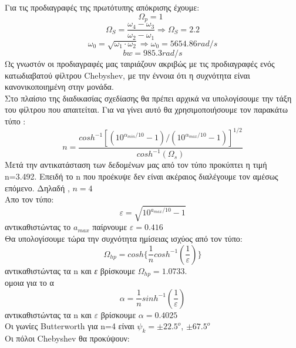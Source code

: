 \documentclass{article}
\begin{document}
{\begin{itemize}
\end{itemize}
Για τις προδιαγραφές της πρωτότυπης απόκρισης έχουμε:
\begin{equation*}
\boxed{Ω_p = 1} \enspace 
\end{equation*}
\begin{equation*}
Ω_S = \frac{ω_4 - ω_3}{ω_2 - ω_1} \Rightarrow \boxed{Ω_S = 2.2}
\end{equation*}
\begin{equation*}
ω_0 = \sqrt{ω_1 \cdot ω_2} \Rightarrow \boxed{ω_0 = 5654.86 rad/s}
\end{equation*}
\begin{equation*}
\boxed{bw = 985.3 rad/s}
\end{equation*}
Ως γνωστόν οι προδιαγραφές μας ταιριάζουν ακριβώς με τις προδιαγραφές ενός κατωδιαβατού φίλτρου Chebyshev, με την έννοια ότι η συχνότητα είναι κανονικοποιημένη στην μονάδα. \\
Στο πλαίσιο της διαδικασίας σχεδίασης θα πρέπει αρχικά να υπολογίσουμε την τάξη του φίλτρου που απαιτείται. Για να γίνει αυτό θα χρησιμοποιήσουμε τον παρακάτω τύπο :
\begin{equation*}
\boxed{n=\frac{cosh^{-1}[(10^{{α_{min}}/{10}}-1)/ (10^{{α_{max}}/{10}}-1)]^{1/2}}{cosh^{-1}(Ω_s)}
}
\end{equation*}
Μετά την αντικατάσταση των δεδομένων μας από τον τύπο προκύπτει η τιμή n=3.492.
Επειδή το n που προέκυψε δεν είναι ακέραιος διαλέγουμε τον αμέσως επόμενο. Δηλαδή , 
$\boxed{n = 4}$ \\
Απο τον τύπο:
\begin{equation*}
\boxed{ε = \sqrt{10^{a_{max}/10} -1}}
\end{equation*}
αντικαθιστώντας το $a_{max}$ παίρνουμε $\boxed{ε = 0.416}$
\\
Θα υπολογίσουμε τώρα την συχνότητα ημίσειας ισχύος από τον τύπο:
\begin{equation*}
\boxed{
Ω_{hp} = cosh\{\frac{1}{n}cosh^{-1}(\frac{1}{ε})\} }
\end{equation*} 
αντικαθιστώντας τα n και\textit{ ε }βρίσκουμε $\boxed{Ω_{hp}=1.0733 }$. \\
ομοια για το α
\begin{equation*}
\boxed{α = \frac{1}{n}sinh^{-1}(\frac{1}{ε})}
\end{equation*}
αντικαθιστώντας τα n και $ε$ βρίσκουμε $\boxed{ α = 0.4025}$ \\ Οι γωνίες Butterworth για n=4 είναι $ψ_k = \pm 22.5^o$, $\pm 67.5^o$ \\ 
Οι πόλοι Chebyshev θα προκύψουν:
}
\end{document}

